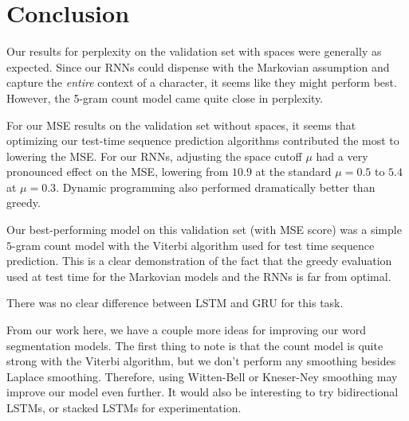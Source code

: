 \documentclass[11pt]{article}
\begin{document}

\section{Conclusion}

Our results for perplexity on the validation set with spaces were generally as expected. Since our RNNs could dispense with the Markovian assumption and capture the \emph{entire} context of a character, it seems like they might perform best. However, the 5-gram count model came quite close in perplexity.

For our MSE results on the validation set without spaces, it seems that optimizing our test-time sequence prediction algorithms contributed the most to lowering the MSE. For our RNNs, adjusting the space cutoff $\mu$ had a very pronounced effect on the MSE, lowering from $10.9$ at the standard $\mu = 0.5$ to $5.4$ at $\mu = 0.3$. Dynamic programming also performed dramatically better than greedy.

Our best-performing model on this validation set (with MSE score) was a simple $5$-gram count model with the Viterbi algorithm used for test time sequence prediction. This is a clear demonstration of the fact that the greedy evaluation used at test time for the Markovian models and the RNNs is far from optimal.  

There was no clear difference between LSTM and GRU for this task.

From our work here, we have a couple more ideas for improving our word segmentation models. The first thing to note is that the count model is quite strong with the Viterbi algorithm, but we don't perform any smoothing besides Laplace smoothing. Therefore, using Witten-Bell or Kneser-Ney smoothing may improve our model even further. It would also be interesting to try bidirectional LSTMs, or stacked LSTMs for experimentation.



\end{document}

